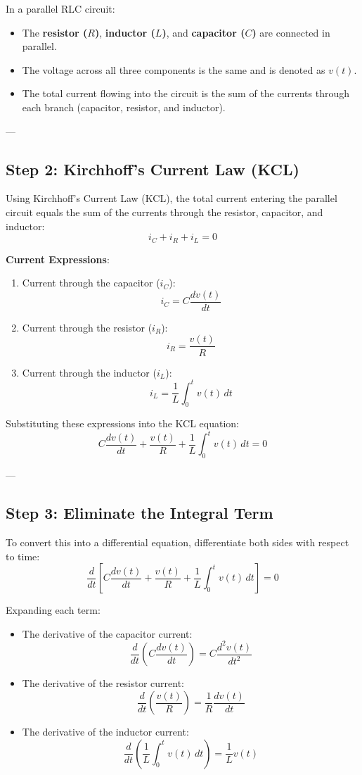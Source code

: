 \documentclass[12pt]{article}
\begin{document}
In a parallel RLC circuit:
\begin{itemize}
    \item The \textbf{resistor (\(R\))}, \textbf{inductor (\(L\))}, and \textbf{capacitor (\(C\))} are connected in parallel.
    \item The voltage across all three components is the same and is denoted as \(v(t)\).
    \item The total current flowing into the circuit is the sum of the currents through each branch (capacitor, resistor, and inductor).
\end{itemize}

---

\subsection*{Step 2: Kirchhoff’s Current Law (KCL)}

Using Kirchhoff's Current Law (KCL), the total current entering the parallel circuit equals the sum of the currents through the resistor, capacitor, and inductor:
\[
i_C + i_R + i_L = 0
\]

\textbf{Current Expressions}:
\begin{enumerate}
    \item Current through the capacitor (\(i_C\)):
    \[
    i_C = C \frac{dv(t)}{dt}
    \]

    \item Current through the resistor (\(i_R\)):
    \[
    i_R = \frac{v(t)}{R}
    \]

    \item Current through the inductor (\(i_L\)):
    \[
    i_L = \frac{1}{L} \int_0^t v(t) \, dt
    \]
\end{enumerate}

Substituting these expressions into the KCL equation:
\[
C \frac{dv(t)}{dt} + \frac{v(t)}{R} + \frac{1}{L} \int_0^t v(t) \, dt = 0 \tag{1}
\]

---

\subsection*{Step 3: Eliminate the Integral Term}

To convert this into a differential equation, differentiate both sides with respect to time:
\[
\frac{d}{dt} \left[ C \frac{dv(t)}{dt} + \frac{v(t)}{R} + \frac{1}{L} \int_0^t v(t) \, dt \right] = 0
\]

Expanding each term:
\begin{itemize}
    \item The derivative of the capacitor current:
    \[
    \frac{d}{dt} \left( C \frac{dv(t)}{dt} \right) = C \frac{d^2v(t)}{dt^2}
    \]

    \item The derivative of the resistor current:
    \[
    \frac{d}{dt} \left( \frac{v(t)}{R} \right) = \frac{1}{R} \frac{dv(t)}{dt}
    \]

    \item The derivative of the inductor current:
    \[
    \frac{d}{dt} \left( \frac{1}{L} \int_0^t v(t) \, dt \right) = \frac{1}{L} v(t)
    \]
\end{itemize}
\end{document}

